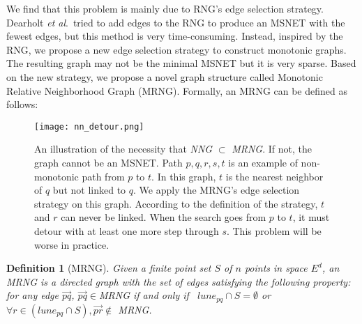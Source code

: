 \documentclass{vldb}
\newtheorem{definition}{Definition}
\def\etal{\emph{et al}.}
\begin{document}
We find that this problem is mainly due to RNG's edge selection strategy. Dearholt \etal ~tried to add edges to the RNG \cite{dearholt1988monotonic} to produce an MSNET with the fewest edges, but this method is very time-consuming. Instead, inspired by the RNG, we propose a new edge selection strategy to construct monotonic graphs. The resulting graph may not be the minimal MSNET but it is very sparse. Based on the new strategy, we propose a novel graph structure called Monotonic Relative Neighborhood Graph (MRNG). Formally, an MRNG can be defined as follows:



\begin{figure}[t]
\begin{center}
\texttt{[image: nn\_detour.png]}
\end{center}
   \caption{An illustration of the necessity that \textit{NNG} $\subset$ \textit{MRNG}. If not, the graph cannot be an MSNET. Path $p,q,r,s,t$ is an example of non-monotonic path from $p$ to $t$. In this graph, $t$ is the nearest neighbor of $q$ but not linked to $q$. We apply the MRNG's edge selection strategy on this graph. According to the definition of the strategy, $t$ and $r$ can never be linked. When the search goes from $p$ to $t$, it must detour with at least one more step through $s$. This problem will be worse in practice.}
\label{nndetour}
\end{figure}

\begin{definition}[MRNG]
\label{MRNGDef}
Given a finite point set $S$ of $n$ points in space $E^d$, an MRNG is a directed graph with the set of edges satisfying the following property: for any edge $\overset{\longrightarrow}{pq}$, $\overset{\longrightarrow}{pq} \in $MRNG if and only if ~$lune_{pq} \cap S = \emptyset$ or $\forall r \in (lune_{pq}\cap S), \overset{\longrightarrow}{pr} \notin$ MRNG.
\end{definition}
\end{document}
